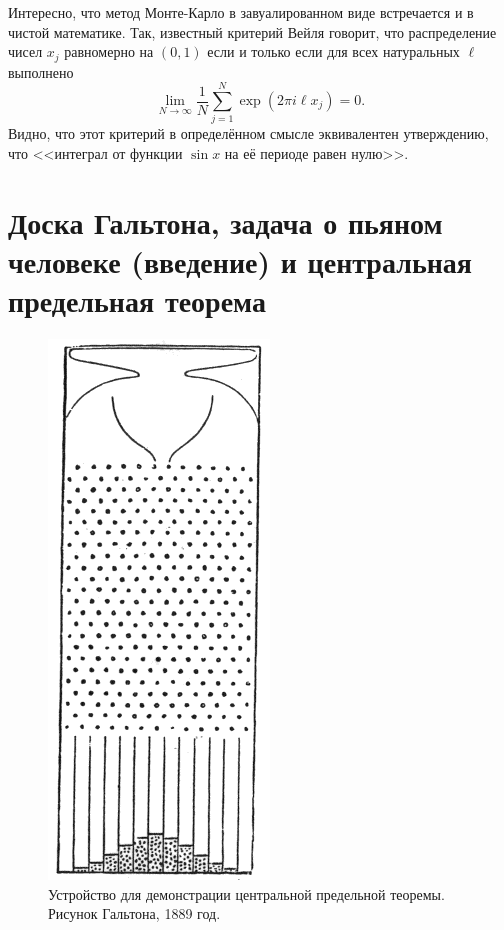 \documentclass{book}
\begin{document}
Интересно, что метод Монте-Карло в завуалированном виде встречается и в чистой математике. Так,
известный критерий Вейля говорит, что распределение чисел $x_j$ равномерно на $(0, 1)$ если и
только если для всех натуральных $\ell$ выполнено
\begin{equation}
    \lim_{N \to \infty} \frac{1}{N} \sum_{j = 1}^N \exp(2 \pi i \ell x_j) = 0.
\end{equation}
Видно, что этот критерий в определённом смысле эквивалентен утверждению, что <<интеграл от функции
$\sin x$ на её периоде равен нулю>>.

\section{Доска Гальтона, задача о пьяном человеке (введение) и центральная предельная теорема}

\begin{figure}
    \includegraphics[width=0.7\linewidth]{Galton_board.png}
    \caption{\label{Galton_board}Устройство для демонстрации центральной предельной
    теоремы. Рисунок Гальтона, 1889 год.}
\end{figure}
\end{document}
